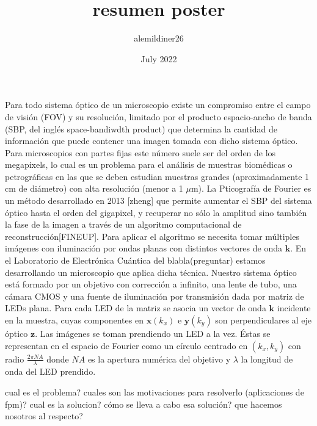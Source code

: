 \documentclass[11pt]{article}
\title{resumen poster}
\author{alemildiner26 }
\date{July 2022}
\begin{document}
\maketitle

Para todo sistema óptico de un microscopio existe un compromiso entre el campo de visión (FOV) y su resolución, limitado por el producto espacio-ancho de banda (SBP, del inglés space-bandiwdth product) que determina la cantidad de información que puede contener una imagen tomada con dicho sistema óptico. Para microscopios con partes fijas este número suele ser del orden de los megapixels, lo cual es un problema para el análisis de muestras biomédicas o petrográficas en las que se deben estudian muestras grandes (aproximadamente 1 cm de diámetro) con alta resolución (menor a 1 $\mu$m). \newline
\indent La Pticografía de Fourier es un método desarrollado en 2013 [zheng] que permite aumentar el SBP del sistema óptico hasta el orden del gigapixel, y recuperar no sólo la amplitud sino también la fase de la imagen a través de un algoritmo computacional de reconstrucción[FINEUP]. Para aplicar el algoritmo se necesita tomar múltiples imágenes con iluminación por ondas planas con distintos vectores de onda $\mathbf{k}$. \newline
\indent En el Laboratorio de Electrónica Cuántica del blabla(preguntar) estamos desarrollando un microscopio que aplica dicha técnica. Nuestro sistema óptico está formado por un objetivo con corrección a infinito, una lente de tubo, una cámara CMOS y una fuente de iluminación por transmisión dada por matriz de LEDs plana. Para cada LED de la matriz se asocia un vector de onda $\mathbf{k}$ incidente en la muestra, cuyas componentes en $\mathbf{x} (k_x)$ e $\mathbf{y} (k_y)$ son perpendiculares al eje óptico $\mathbf{z}$. Las imágenes se toman prendiendo un LED a la vez. Éstas se representan en el espacio de Fourier como un círculo centrado en $(k_x, k_y)$ con radio $\frac{2\pi NA}{\lambda}$ donde $NA$ es la apertura numérica del objetivo y $\lambda$ la longitud de onda del LED prendido.

\newline

cual es el problema?
cuales son las motivaciones para resolverlo (aplicaciones de fpm)?
cual es la solucion?
cómo se lleva a cabo esa solución?
que hacemos nosotros al respecto?
\end{document}
